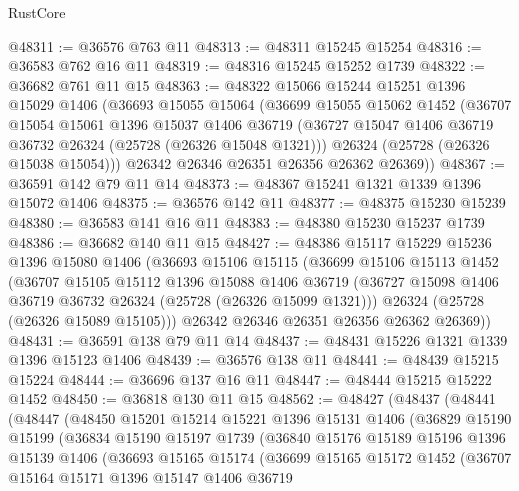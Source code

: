 \begin{lexlean}{RustCore}
\begin{coremodule}
@48311 := @36576 @763 @11
@48313 := @48311 @15245 @15254
@48316 := @36583 @762 @16 @11
@48319 := @48316 @15245 @15252 @1739
@48322 := @36682 @761 @11 @15
@48363 := @48322
    @15066
    @15244
    @15251
    @1396
    @15029
    @1406
    (@36693
      @15055
      @15064
      (@36699
        @15055
        @15062
        @1452
        (@36707
          @15054
          @15061
          @1396
          @15037
          @1406
          @36719
          (@36727 @15047 @1406 @36719 @36732 @26324 (@25728 (@26326 @15048 @1321)))
          @26324
          (@25728 (@26326 @15038 @15054)))
        @26342
        @26346
        @26351
        @26356
        @26362
        @26369))
@48367 := @36591 @142 @79 @11 @14
@48373 := @48367 @15241 @1321 @1339 @1396 @15072 @1406
@48375 := @36576 @142 @11
@48377 := @48375 @15230 @15239
@48380 := @36583 @141 @16 @11
@48383 := @48380 @15230 @15237 @1739
@48386 := @36682 @140 @11 @15
@48427 := @48386
    @15117
    @15229
    @15236
    @1396
    @15080
    @1406
    (@36693
      @15106
      @15115
      (@36699
        @15106
        @15113
        @1452
        (@36707
          @15105
          @15112
          @1396
          @15088
          @1406
          @36719
          (@36727 @15098 @1406 @36719 @36732 @26324 (@25728 (@26326 @15099 @1321)))
          @26324
          (@25728 (@26326 @15089 @15105)))
        @26342
        @26346
        @26351
        @26356
        @26362
        @26369))
@48431 := @36591 @138 @79 @11 @14
@48437 := @48431 @15226 @1321 @1339 @1396 @15123 @1406
@48439 := @36576 @138 @11
@48441 := @48439 @15215 @15224
@48444 := @36696 @137 @16 @11
@48447 := @48444 @15215 @15222 @1452
@48450 := @36818 @130 @11 @15
@48562 := @48427
    (@48437
      (@48441
        (@48447
          (@48450
            @15201
            @15214
            @15221
            @1396
            @15131
            @1406
            (@36829
              @15190
              @15199
              (@36834
                @15190
                @15197
                @1739
                (@36840
                  @15176
                  @15189
                  @15196
                  @1396
                  @15139
                  @1406
                  (@36693
                    @15165
                    @15174
                    (@36699
                      @15165
                      @15172
                      @1452
                      (@36707
                        @15164
                        @15171
                        @1396
                        @15147
                        @1406
                        @36719

\end{coremodule}
\end{lexlean}
